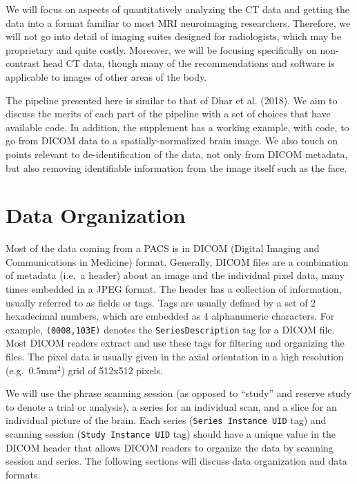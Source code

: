 \documentclass[]{elsarticle} %
\begin{document}
We will focus on aspects of quantitatively analyzing the CT data and getting the data into a format familiar to most MRI neuroimaging researchers. Therefore, we will not go into detail of imaging suites designed for radiologists, which may be proprietary and quite costly. Moreover, we will be focusing specifically on non-contrast head CT data, though many of the recommendations and software is applicable to images of other areas of the body.

The pipeline presented here is similar to that of Dhar et al. (2018). We aim to discuss the merits of each part of the pipeline with a set of choices that have available code. In addition, the supplement has a working example, with code, to go from DICOM data to a spatially-normalized brain image. We also touch on points relevant to de-identification of the data, not only from DICOM metadata, but also removing identifiable information from the image itself such as the face.

\hypertarget{data-organization}{%
\section{Data Organization}\label{data-organization}}

Most of the data coming from a PACS is in DICOM (Digital Imaging and Communications in Medicine) format. Generally, DICOM files are a combination of metadata (i.e.~a header) about an image and the individual pixel data, many times embedded in a JPEG format. The header has a collection of information, usually referred to as fields or tags. Tags are usually defined by a set of 2 hexadecimal numbers, which are embedded as 4 alphanumeric characters. For example, \texttt{(0008,103E)} denotes the \texttt{SeriesDescription} tag for a DICOM file. Most DICOM readers extract and use these tags for filtering and organizing the files. The pixel data is usually given in the axial orientation in a high resolution (e.g.~\(0.5\)mm\(^2\)) grid of 512x512 pixels.

We will use the phrase scanning session (as opposed to ``study'' and reserve study to denote a trial or analysis), a series for an individual scan, and a slice for an individual picture of the brain. Each series (\texttt{Series\ Instance\ UID} tag) and scanning session (\texttt{Study\ Instance\ UID} tag) should have a unique value in the DICOM header that allows DICOM readers to organize the data by scanning session and series. The following sections will discuss data organization and data formats.
\end{document}
